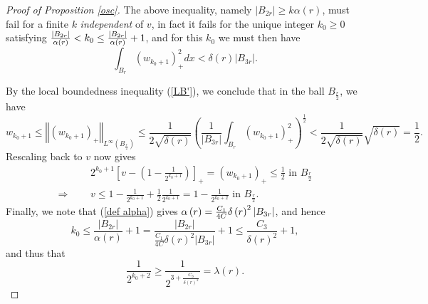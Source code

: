 \documentclass{amsart}
\theoremstyle{plain}
\numberwithin{equation}{section}
\begin{document}
\begin{proof}[Proof of Proposition \protect\ref{osc}]
	The above inequality, namely $\left\vert B_{2r}\right\vert \geq k\alpha
	\left( r\right) $, must fail for a finite $k$ \emph{independent} of $v$, in
	fact it fails for the unique integer $k_{0}\geq 0$ satisfying $\frac{%
		\left\vert B_{2r}\right\vert }{\alpha \left( r\right) }<k_{0}\leq \frac{%
		\left\vert B_{2r}\right\vert }{\alpha \left( r\right) }+1$, and for this $%
	k_{0}$ we must then have 
	\begin{equation*}
	\int_{B_{r}}(w_{k_{0}+1})_{+}^{2}dx<\delta \left( r\right) \left\vert
	B_{3r}\right\vert .
	\end{equation*}
	
	By the local boundedness inequality (\ref{LB'}), we conclude that in the
	ball $B_{\frac{r}{2}}$, we have 
	\begin{equation*}
	w_{k_{0}+1}\leq \left\Vert \left( w_{k_{0}+1}\right) _{+}\right\Vert
	_{L^{\infty }\left( B_{\frac{r}{2}}\right) }\leq \frac{1}{2\sqrt{\delta
			\left( r\right) }}\left( \frac{1}{\left\vert B_{3r}\right\vert }%
	\int_{B_{r}}\left( w_{k_{0}+1}\right) _{+}^{2}\right) ^{\frac{1}{2}}<\frac{1%
	}{2\sqrt{\delta \left( r\right) }}\sqrt{\delta \left( r\right) }=\frac{1}{2}.
	\end{equation*}%
	Rescaling back to $v$ now gives%
	\begin{eqnarray*}
		&&2^{k_{0}+1}\left[ v-\left( 1-\frac{1}{2^{k_{0}+1}}\right) \right]
		_{+}=\left( w_{k_{0}+1}\right) _{+}\leq \frac{1}{2}\text{ in }B_{\frac{r}{2}}
		\\
		\Longrightarrow \text{ \ \ \ \ } &&v\leq 1-\frac{1}{2^{k_{0}+1}}+\frac{1}{2}%
		\frac{1}{2^{k_{0}+1}}=1-\frac{1}{2^{k_{0}+2}}\text{ in }B_{\frac{r}{2}}.
	\end{eqnarray*}%
	Finally, we note that (\ref{def alpha}) gives $\alpha \left( r\right) =\frac{%
		C_{1}}{4C}\delta \left( r\right) ^{2}\left\vert B_{3r}\right\vert $, and
	hence 
	\begin{equation*}
	k_{0}\leq \frac{\left\vert B_{2r}\right\vert }{\alpha \left( r\right) }+1=%
	\frac{\left\vert B_{2r}\right\vert }{\frac{C_{1}}{4C}\delta \left( r\right)
		^{2}\left\vert B_{3r}\right\vert }+1\leq \frac{C_{3}}{\delta \left( r\right)
		^{2}}+1,
	\end{equation*}%
	and thus that 
	\begin{equation*}
	\frac{1}{2^{k_{0}+2}}\geq \frac{1}{2^{3+\frac{C_{3}}{\delta \left( r\right)
				^{2}}}}=\lambda (r).
	\end{equation*}
\end{proof}
\end{document}
